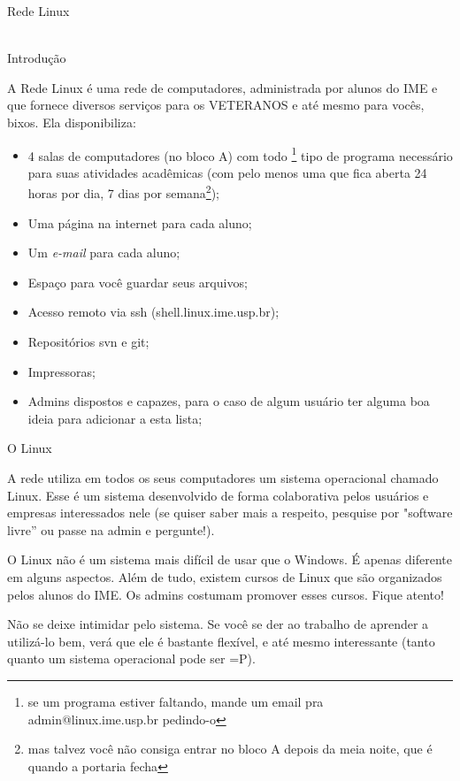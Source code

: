\begin{secao}{Rede Linux}
\\
\\
\begin{subsecao}{Introdução}

A Rede Linux é uma rede de computadores, administrada por alunos do IME e
que fornece diversos serviços para os VETERANOS e até mesmo para vocês, bixos.
Ela disponibiliza:

\begin{itemize}
\item 4 salas de computadores (no bloco A) com todo \footnote{se um programa
estiver faltando, mande um email pra admin@linux.ime.usp.br pedindo-o} tipo de
programa necessário para suas atividades acadêmicas (com pelo menos uma que fica
aberta 24 horas por dia, 7 dias por semana\footnote{mas
talvez você não consiga entrar no bloco A depois da meia noite, que é quando a
portaria fecha});
\item Uma página na internet para cada aluno;
\item Um \textit{e-mail} para cada aluno;
\item Espaço para você guardar seus arquivos;
\item Acesso remoto via ssh (shell.linux.ime.usp.br);
\item Repositórios svn e git;
\item Impressoras;
\item Admins dispostos e capazes, para o caso de algum usuário ter alguma boa
ideia para adicionar a esta lista;
\end{itemize}
\end{subsecao}

\begin{subsecao}{O Linux}

A rede utiliza em todos os seus computadores um sistema operacional chamado
Linux. Esse é um sistema desenvolvido de forma colaborativa pelos usuários
e empresas interessados nele (se quiser saber mais a respeito, pesquise
por "software livre” ou passe na admin e pergunte!).

O Linux não é um sistema mais difícil de usar que o Windows. É apenas
diferente em alguns aspectos. Além de tudo, existem cursos de Linux que são
organizados pelos alunos do IME. Os admins costumam promover esses cursos. Fique atento!

Não se deixe intimidar pelo sistema. Se você se der ao trabalho de
aprender a utilizá-lo bem, verá que ele é bastante flexível, e até mesmo
interessante (tanto quanto um sistema operacional pode ser =P).


\end{subsecao}
\end{secao}
